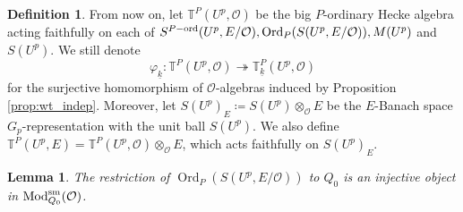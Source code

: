 \documentclass[leqno]{amsart}
\newtheorem{lem}[thm]{Lemma}
\theoremstyle{definition}
\newtheorem{defn}[thm]{Definition}
\theoremstyle{remark}
\newcommand{\oo}{\mathcal{O}}
\DeclareMathOperator{\Mod}{\textnormal{Mod}}
\DeclareMathOperator{\Ord}{Ord} %
\newcommand{\sm}{\textnormal{sm}}
\newcommand{\wt}[1]{\underline{ #1 }}
\newcommand{\TT}{\mathbb{T}} %
\newcommand{\ord}{\textnormal{ord}} %
\begin{document}
\begin{defn}\label{def:big_hecke}
	From now on, let $\TT^P(U^p,\oo)$
	be the big $P$-ordinary Hecke algebra 
	acting faithfully on each of 
	$S^{P-\ord}(U^p,E/\oo), \Ord_P(S(U^p,E/\oo)), M(U^p)$
	and $S(U^p)$. 
	We still denote 
	\[
		\varphi_{\wt{k}}\colon \TT^P(U^p,\oo)\twoheadrightarrow
		\TT^P_{\wt{k}}(U^p,\oo)
	\]
	for the surjective homomorphism of $\oo$-algebras
	induced by Proposition \ref{prop:wt_indep}.
	Moreover, 
	let $S(U^p)_E\coloneqq S(U^p)\otimes_{\oo}E$
	be the $E$-Banach space $G_p$-representation with 
	the unit ball $S(U^p)$. 
	We also define $\TT^P(U^p,E)=\TT^P(U^p,\oo)\otimes_{\oo}E$,
	which acts faithfully on $S(U^p)_E$.
\end{defn}


\begin{lem}\label{lem:inj}
	The restriction of
	$\Ord_P(S(U^p,E/\oo))$ to $Q_0$ 
	is an injective object
	in $\Mod^{\sm}_{Q_0}(\oo)$.
\end{lem}
\end{document}
